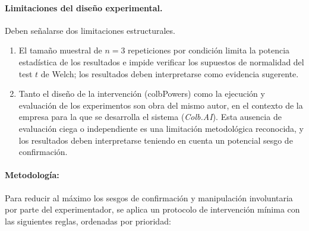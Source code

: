 \documentclass[11pt, letterpaper]{article}
\begin{document}
\paragraph{Limitaciones del diseño experimental.} Deben señalarse dos limitaciones estructurales.
\begin{enumerate}
    \item El tamaño muestral de $n=3$ repeticiones por condición limita la potencia estadística de los resultados e impide verificar los supuestos de normalidad del test $t$ de Welch; los resultados deben interpretarse como evidencia sugerente. 
    \item Tanto el diseño de la intervención (colbPowers) como la ejecución y evaluación de los experimentos son obra del mismo autor, en el contexto de la empresa para la que se desarrolla el sistema (\textit{Colb.AI}). Esta ausencia de evaluación ciega o independiente es una limitación metodológica reconocida, y los resultados deben interpretarse teniendo en cuenta un potencial sesgo de confirmación. 
\end{enumerate}

\paragraph{Metodología:} Para reducir al máximo los sesgos de
confirmación y manipulación involuntaria por parte del experimentador,
se aplica un protocolo de intervención mínima con las siguientes
reglas, ordenadas por prioridad:
\end{document}
